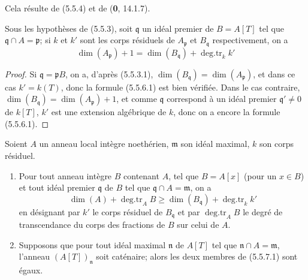 Cela résulte de (5.5.4) et de (\textbf{0}, 14.1.7).

\begin{corollary}[5.5.6]
\label{IV.2.s5.5.6-fr}
Sous les hypothèses de \textup{(5.5.3)}, soit $\mathfrak q$ un idéal premier de
$B=A[T]$ tel que $\mathfrak q\cap A=\mathfrak p$; si $k$ et $k'$ sont les
corps résiduels de $A_{\mathfrak p}$ et $B_{\mathfrak q}$ respectivement,
on a
\begin{equation}
\dim(A_{\mathfrak p})+1
=\dim(B_{\mathfrak q})+\operatorname{deg.tr}_k k'
\tag{5.5.6.1}\label{IV.2.s5.5.6.1-fr}
\end{equation}
\end{corollary}

\begin{proof}

Si $\mathfrak q=\mathfrak pB$, on a, d'après (5.5.3.1),
$\dim(B_{\mathfrak q})=\dim(A_{\mathfrak p})$, et dans ce cas $k'=k(T)$,
donc la formule (5.5.6.1) est bien vérifiée. Dans le cas contraire,
$\dim(B_{\mathfrak q})=\dim(A_{\mathfrak p})+1$, et comme $\mathfrak q$
correspond à un idéal premier $\mathfrak q'\ne0$ de $k[T]$, $k'$ est une
extension algébrique de $k$, donc on a encore la formule (5.5.6.1).
\end{proof}

\begin{lemma}[5.5.7]
\label{IV.2.s5.5.7-fr}
Soient $A$ un anneau local intègre noethérien, $\mathfrak m$ son idéal
maximal, $k$ son corps résiduel.
\begin{enumerate}
\item[\textup{(i)}] Pour tout anneau intègre $B$ contenant $A$, tel que $B=A[x]$
(pour un $x\in B$) et tout idéal premier $\mathfrak q$ de $B$ tel que
$\mathfrak q\cap A=\mathfrak m$, on a
\begin{equation}
\dim(A)+\operatorname{deg.tr}_A B
\geq\dim(B_{\mathfrak q})+\operatorname{deg.tr}_k k'
\tag{5.5.7.1}\label{IV.2.s5.5.7.1-fr}
\end{equation}
en désignant par $k'$ le corps résiduel de $B_{\mathfrak q}$ et par
$\operatorname{deg.tr}_A B$ le degré de transcendance du corps des
fractions de $B$ sur celui de $A$.
\item[\textup{(ii)}] Supposons que pour tout idéal maximal $\mathfrak n$ de $A[T]$
tel que $\mathfrak n\cap A=\mathfrak m$, l'anneau $(A[T])_{\mathfrak n}$
soit caténaire; alors les deux membres de \textup{(5.5.7.1)} sont égaux.
\end{enumerate}
\end{lemma}

